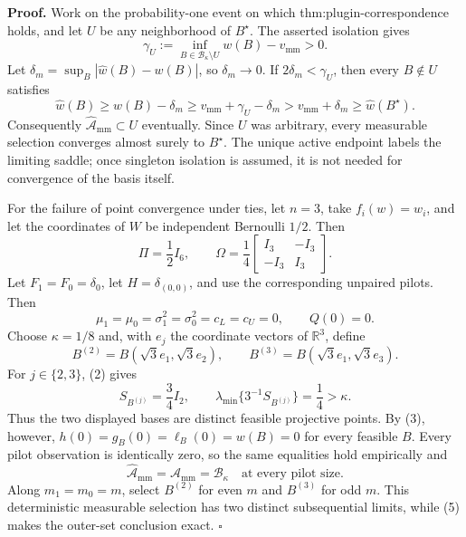 \textbf{Proof.}
Work on the probability-one event on which thm:plugin-correspondence holds, and let \(U\) be any neighborhood of \(B^\star\).  The asserted isolation gives
\[
\gamma_U:=\inf_{B\in\mathcal B_\kappa\setminus U}w(B)-v_{\mathrm{mm}}>0.
\tag{1}
\]
Let \(\delta_m=\sup_B|\widehat w(B)-w(B)|\), so \(\delta_m\to0\).  If \(2\delta_m<\gamma_U\), then every \(B\notin U\) satisfies
\[
\widehat w(B)\ge w(B)-\delta_m
\ge v_{\mathrm{mm}}+\gamma_U-\delta_m
>v_{\mathrm{mm}}+\delta_m
\ge\widehat w(B^\star).
\]
Consequently \(\widehat{\mathcal A}_{\mathrm{mm}}\subset U\) eventually.  Since \(U\) was arbitrary, every measurable selection converges almost surely to \(B^\star\).  The unique active endpoint labels the limiting saddle; once singleton isolation is assumed, it is not needed for convergence of the basis itself.

For the failure of point convergence under ties, let \(n=3\), take \(f_i(w)=w_i\), and let the coordinates of \(W\) be independent Bernoulli \(1/2\).  Then
\[
\Pi=\frac12I_6,
\qquad
\Omega=\frac14\begin{bmatrix}I_3&-I_3\\-I_3&I_3\end{bmatrix}.
\tag{2}
\]
Let \(F_1=F_0=\delta_0\), let \(H=\delta_{(0,0)}\), and use the corresponding unpaired pilots.  Then
\[
\mu_1=\mu_0=\sigma_1^2=\sigma_0^2=c_L=c_U=0,
\qquad Q(0)=0.
\tag{3}
\]
Choose \(\kappa=1/8\) and, with \(e_j\) the coordinate vectors of \(\mathbb R^3\), define
\[
B^{(2)}=B(\sqrt3e_1,\sqrt3e_2),
\qquad B^{(3)}=B(\sqrt3e_1,\sqrt3e_3).
\]
For \(j\in\{2,3\}\), (2) gives
\[
S_{B^{(j)}}=\frac34I_2,
\qquad
\lambda_{\min}\{3^{-1}S_{B^{(j)}}\}=\frac14>\kappa.
\tag{4}
\]
Thus the two displayed bases are distinct feasible projective points.  By (3), however, \(h(0)=g_B(0)=\ell_B(0)=w(B)=0\) for every feasible \(B\).  Every pilot observation is identically zero, so the same equalities hold empirically and
\[
\widehat{\mathcal A}_{\mathrm{mm}}
=\mathcal A_{\mathrm{mm}}=\mathcal B_\kappa
\quad\text{at every pilot size}.
\tag{5}
\]
Along \(m_1=m_0=m\), select \(B^{(2)}\) for even \(m\) and \(B^{(3)}\) for odd \(m\).  This deterministic measurable selection has two distinct subsequential limits, while (5) makes the outer-set conclusion exact. \(\square\)